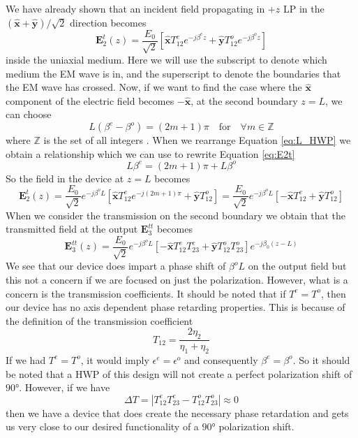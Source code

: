 \documentclass{optica-article}
\newcommand{\bv}[1]{\mathbf{#1}}
\begin{document}
We have already shown that an incident field propagating in $+z$ LP in the
$(\bv{\hat{x}} + \bv{\hat{y}})/\sqrt{2}$ direction becomes
\begin{equation}\label{eq:E2t}
  \bv{E}_2^t(z) = \frac{E_0}{\sqrt{2}}\left[\bv{\hat{x}}T_{12}^ee^{-j\beta^e z}
   + \bv{\hat{y}}T_{12}^oe^{-j\beta^o z}\right]
\end{equation}
inside the uniaxial medium. Here we will use the subscript to denote
which medium the EM wave is in, and the superscript to denote the boundaries 
that the EM wave has crossed. Now, if we want to find the case where the 
$\bv{\hat{x}}$ component of the electric field becomes $-\bv{\hat{x}}$, at 
the second boundary $z=L$, we can choose
\begin{equation}\label{eq:L_HWP}
  L(\beta^e-\beta^o) = (2m+1)\pi
  \quad\mathrm{for}\quad
  \forall m \in \mathbb{Z}
\end{equation}
where $\mathbb{Z}$ is the set of all integers \cite{Wav_anis}. 
When we rearrange Equation 
\eqref{eq:L_HWP} we obtain a relationship which we can use to rewrite
Equation \eqref{eq:E2t}
$$
  L\beta^e = (2m+1)\pi + L\beta^o
$$
So the field in the device at $z=L$ becomes
\begin{equation}\label{eq:E2t_L}
  \bv{E}_2^t(z) = \frac{E_0}{\sqrt{2}}e^{-j\beta^oL}
  \left[\bv{\hat{x}}T_{12}^ee^{-j(2m+1)\pi}
   + \bv{\hat{y}}T_{12}^o\right]
   = \frac{E_0}{\sqrt{2}}e^{-j\beta^oL}
   \left[-\bv{\hat{x}}T_{12}^e
    + \bv{\hat{y}}T_{12}^o\right]
\end{equation}
When we consider the transmission on the second boundary we obtain that the
transmitted field at the output $\bv{E}_{3}^{tt}$ becomes
\begin{equation}\label{eq:E3tt}
  \bv{E}_3^{tt}(z) = \frac{E_0}{\sqrt{2}}e^{-j\beta^oL}
  \left[-\bv{\hat{x}}T_{12}^e T_{23}^e
   + \bv{\hat{y}}T_{12}^o T_{23}^o\right]e^{-j\beta_0(z-L)}
\end{equation}
We see that our device does impart a phase shift of $\beta^oL$ on the output
field but this not a concern if we are focused on just the polarization. 
However, what is a concern is the transmission coefficients. It should be noted
that if $T^e = T^o$, then our device has no axis dependent phase retarding 
properties. This is because of the definition of the transmission coefficient
$$
T_{12} = \frac{2\eta_2}{\eta_1 + \eta_2}
$$
If we had $T^e = T^o$, it would imply $\epsilon^e=\epsilon^o$ and consequently
$\beta^e=\beta^o$. So it should be noted that a HWP of this design will not
create a perfect polarization shift of $\ang{90}$. However, if we have
\begin{equation}\label{eq:delta_T}
  \Delta T = |T_{12}^e T_{23}^e - T_{12}^o T_{23}^o| \approx 0
\end{equation}
then we have a device that does create the necessary phase retardation and gets
us very close to our desired functionality of a $\ang{90}$ polarization shift.
\end{document}
